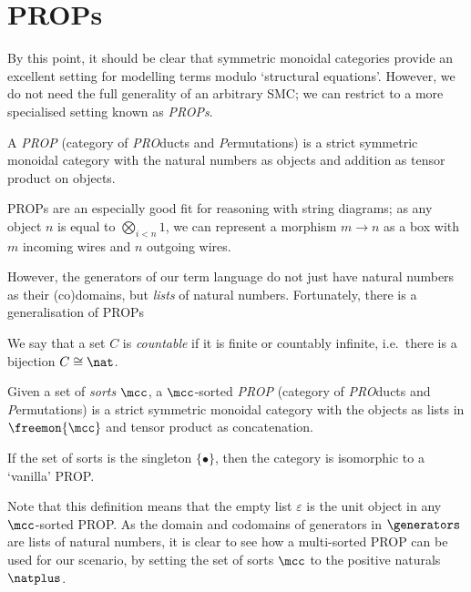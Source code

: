 \section{PROPs}

By this point, it should be clear that symmetric monoidal categories provide
an excellent setting for modelling terms modulo `structural equations'.
However, we do not need the full generality of an arbitrary SMC; we can restrict
to a more specialised setting known as \emph{PROPs}.

\begin{definition}
    A \emph{PROP} (category of \emph{PRO}ducts and \emph{P}ermutations) is a
    strict symmetric monoidal category with the natural numbers as objects and
    addition as tensor product on objects.
\end{definition}

PROPs are an especially good fit for reasoning with string diagrams; as any
object \(n\) is equal to \(\bigotimes_{i < n} 1\), we can represent a morphism
\(m \to n\) as a box with \(m\) incoming wires and \(n\) outgoing wires.

However, the generators of our term language do not just have natural numbers
as their (co)domains, but \emph{lists} of natural numbers.
Fortunately, there is a generalisation of PROPs

\begin{notation}
    We say that a set \(C\) is \emph{countable} if it is finite or countably
    infinite, i.e.\ there is a bijection \(C \cong \nat\).
\end{notation}

\begin{definition}
    Given a set of \emph{sorts} \(\mcc\), a \(\mcc\)-sorted \emph{PROP}
    (category of \emph{PRO}ducts and \emph{P}ermutations) is a strict symmetric
    monoidal category with the objects as lists in \(\freemon{\mcc}\) and tensor
    product as concatenation.
\end{definition}

\begin{remark}
    If the set of sorts is the singleton \(\{\bullet\}\), then the category is
    isomorphic to a `vanilla' PROP.
\end{remark}

Note that this definition means that the empty list \(\varepsilon\) is the unit
object in any \(\mcc\)-sorted PROP.
As the domain and codomains of generators in \(\generators\) are lists of
natural numbers, it is clear to see how a multi-sorted PROP can be used for our
scenario, by setting the set of sorts \(\mcc\) to the positive naturals
\(\natplus\).

